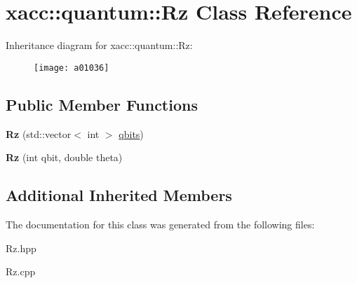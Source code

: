 \hypertarget{a01036}{}\section{xacc\+:\+:quantum\+:\+:Rz Class Reference}
\label{a01036}
Inheritance diagram for xacc\+:\+:quantum\+:\+:Rz\+:\begin{figure}[H]
\begin{center}
\leavevmode
\texttt{[image: a01036]}
\end{center}
\end{figure}
\subsection*{Public Member Functions}
\begin{DoxyCompactItemize}
\item 
\mbox{\label{a01036_a7ce912c7f9c9e8f4e7e60f9dba95538b}} 
{\bfseries Rz} (std\+::vector$<$ int $>$ \hyperlink{a00992_a2a56be6c2519ea65df4d06f4abae1393}{qbits})
\item 
\mbox{\label{a01036_ae30eaf75feb8f896c22043629d21b834}} 
{\bfseries Rz} (int qbit, double theta)
\end{DoxyCompactItemize}
\subsection*{Additional Inherited Members}


The documentation for this class was generated from the following files\+:\begin{DoxyCompactItemize}
\item 
Rz.\+hpp\item 
Rz.\+cpp\end{DoxyCompactItemize}
